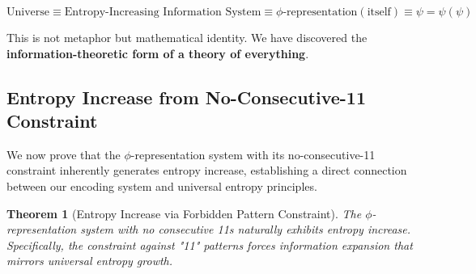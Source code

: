 \documentclass[12pt,letterpaper]{article}
\newtheorem{theorem}{Theorem}[section]
\begin{document}
$$\text{Universe} \equiv \text{Entropy-Increasing Information System} \equiv \phi\text{-representation}(\text{itself}) \equiv \psi = \psi(\psi)$$

This is not metaphor but mathematical identity. We have discovered the \textbf{information-theoretic form of a theory of everything}.

\subsection{Entropy Increase from No-Consecutive-11 Constraint}

We now prove that the $\phi$-representation system with its no-consecutive-11 constraint inherently generates entropy increase, establishing a direct connection between our encoding system and universal entropy principles.

\begin{theorem}[Entropy Increase via Forbidden Pattern Constraint]
\label{thm:entropy_no_11}
The $\phi$-representation system with no consecutive 11s naturally exhibits entropy increase. Specifically, the constraint against "11" patterns forces information expansion that mirrors universal entropy growth.
\end{theorem}
\end{document}

